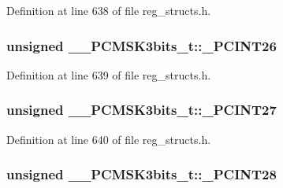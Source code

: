 Definition at line 638 of file reg\+\_\+structs.\+h.

\hypertarget{union_____p_c_m_s_k3bits__t_a798486e5466f184399b2991dc14dd300}{
\subsubsection[{\+\_\+\+P\+C\+I\+N\+T26}]{\setlength{\rightskip}{0pt plus 5cm}unsigned \+\_\+\+\_\+\+P\+C\+M\+S\+K3bits\+\_\+t\+::\+\_\+\+P\+C\+I\+N\+T26}}\label{union_____p_c_m_s_k3bits__t_a798486e5466f184399b2991dc14dd300}


Definition at line 639 of file reg\+\_\+structs.\+h.

\hypertarget{union_____p_c_m_s_k3bits__t_a53a5bfa63892b4e8906aaa2eeaa3fd88}{
\subsubsection[{\+\_\+\+P\+C\+I\+N\+T27}]{\setlength{\rightskip}{0pt plus 5cm}unsigned \+\_\+\+\_\+\+P\+C\+M\+S\+K3bits\+\_\+t\+::\+\_\+\+P\+C\+I\+N\+T27}}\label{union_____p_c_m_s_k3bits__t_a53a5bfa63892b4e8906aaa2eeaa3fd88}


Definition at line 640 of file reg\+\_\+structs.\+h.

\hypertarget{union_____p_c_m_s_k3bits__t_aa9e168d399723ffc0a69ee857f4fc4d0}{
\subsubsection[{\+\_\+\+P\+C\+I\+N\+T28}]{\setlength{\rightskip}{0pt plus 5cm}unsigned \+\_\+\+\_\+\+P\+C\+M\+S\+K3bits\+\_\+t\+::\+\_\+\+P\+C\+I\+N\+T28}}\label{union_____p_c_m_s_k3bits__t_aa9e168d399723ffc0a69ee857f4fc4d0}



